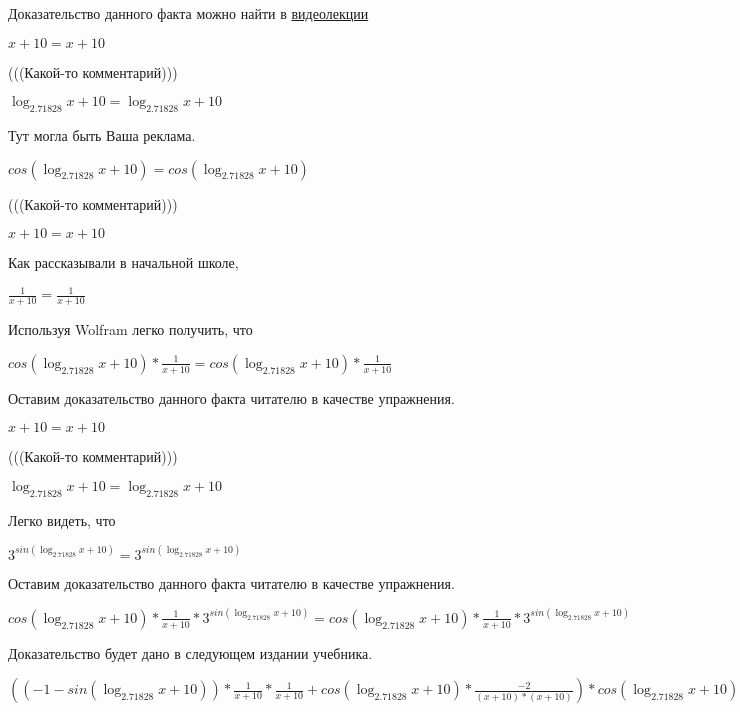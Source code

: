 \documentclass[12pt,a4paper,fleqn]{article}
\theoremstyle{definition}
\begin{document}
Доказательство данного факта можно найти в \href{https://www.youtube.com/watch?v=dQw4w9WgXcQ}{видеолекции}

$ x  +  10  =  x  +  10 $

(((Какой-то комментарий)))

$\log_{ 2.71828 }{ x  +  10 } = \log_{ 2.71828 }{ x  +  10 }$

Тут могла быть Ваша реклама.

$cos(\log_{ 2.71828 }{ x  +  10 }) = cos(\log_{ 2.71828 }{ x  +  10 })$

(((Какой-то комментарий)))

$ x  +  10  =  x  +  10 $

Как рассказывали в начальной школе,

$\frac{ 1 }{ x  +  10 }
 = \frac{ 1 }{ x  +  10 }
$

Используя Wolfram легко получить, что

$cos(\log_{ 2.71828 }{ x  +  10 }) * \frac{ 1 }{ x  +  10 }
 = cos(\log_{ 2.71828 }{ x  +  10 }) * \frac{ 1 }{ x  +  10 }
$

Оставим доказательство данного факта читателю в качестве упражнения.

$ x  +  10  =  x  +  10 $

(((Какой-то комментарий)))

$\log_{ 2.71828 }{ x  +  10 } = \log_{ 2.71828 }{ x  +  10 }$

Легко видеть, что

${ 3 }^{sin(\log_{ 2.71828 }{ x  +  10 })} = { 3 }^{sin(\log_{ 2.71828 }{ x  +  10 })}$

Оставим доказательство данного факта читателю в качестве упражнения.

$cos(\log_{ 2.71828 }{ x  +  10 }) * \frac{ 1 }{ x  +  10 }
 * { 3 }^{sin(\log_{ 2.71828 }{ x  +  10 })} = cos(\log_{ 2.71828 }{ x  +  10 }) * \frac{ 1 }{ x  +  10 }
 * { 3 }^{sin(\log_{ 2.71828 }{ x  +  10 })}$

Доказательство будет дано в следующем издании учебника.

$(( -1  - sin(\log_{ 2.71828 }{ x  +  10 })) * \frac{ 1 }{ x  +  10 }
 * \frac{ 1 }{ x  +  10 }
 + cos(\log_{ 2.71828 }{ x  +  10 }) * \frac{ -2 }{( x  +  10 ) * ( x  +  10 )}
) * cos(\log_{ 2.71828 }{ x  +  10 }) * \frac{ 1 }{ x  +  10 }
 * { 3 }^{sin(\log_{ 2.71828 }{ x  +  10 })} = (( -1  - sin(\log_{ 2.71828 }{ x  +  10 })) * \frac{ 1 }{ x  +  10 }
 * \frac{ 1 }{ x  +  10 }
 + cos(\log_{ 2.71828 }{ x  +  10 }) * \frac{ -2 }{( x  +  10 ) * ( x  +  10 )}
) * cos(\log_{ 2.71828 }{ x  +  10 }) * \frac{ 1 }{ x  +  10 }
 * { 3 }^{sin(\log_{ 2.71828 }{ x  +  10 })}$
\end{document}
